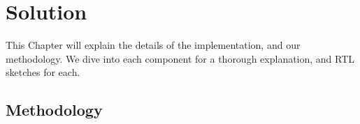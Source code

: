 \chapter{Solution}
This Chapter will explain the details of the implementation, and our methodology. We dive into each component for a thorough explanation, and RTL sketches for each.


\section{Methodology}


